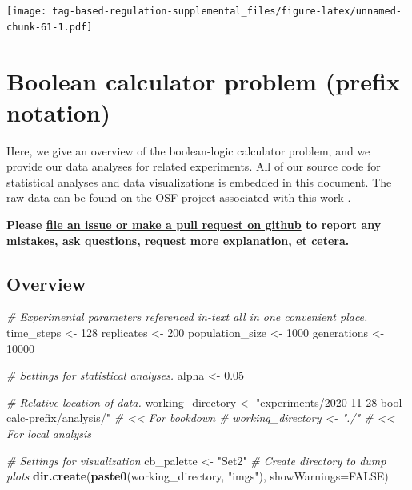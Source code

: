\documentclass[]{book}
\newenvironment{Shaded}{\begin{snugshade}}{\end{snugshade}}
\newcommand{\CommentTok}[1]{\textcolor[rgb]{0.56,0.35,0.01}{\textit{#1}}}
\newcommand{\DataTypeTok}[1]{\textcolor[rgb]{0.13,0.29,0.53}{#1}}
\newcommand{\DecValTok}[1]{\textcolor[rgb]{0.00,0.00,0.81}{#1}}
\newcommand{\FloatTok}[1]{\textcolor[rgb]{0.00,0.00,0.81}{#1}}
\newcommand{\KeywordTok}[1]{\textcolor[rgb]{0.13,0.29,0.53}{\textbf{#1}}}
\newcommand{\NormalTok}[1]{#1}
\newcommand{\OtherTok}[1]{\textcolor[rgb]{0.56,0.35,0.01}{#1}}
\newcommand{\StringTok}[1]{\textcolor[rgb]{0.31,0.60,0.02}{#1}}
\begin{document}
\texttt{[image: tag-based-regulation-supplemental\_files/figure-latex/unnamed-chunk-61-1.pdf]}

\hypertarget{boolean-calculator-problem-prefix-notation}{%
\chapter{Boolean calculator problem (prefix notation)}\label{boolean-calculator-problem-prefix-notation}}

Here, we give an overview of the boolean-logic calculator problem, and we provide our data analyses for related experiments.
All of our source code for statistical analyses and data visualizations is embedded in this document.
The raw data can be found on the OSF project associated with this work \citep{Lalejini_Moreno_Ofria_Data_2020}.

\textbf{Please \href{https://github.com/amlalejini/Tag-based-Genetic-Regulation-for-LinearGP/issues}{file an issue or make a pull request on github} to report any mistakes, ask questions, request more explanation, et cetera.}

\hypertarget{overview-2}{%
\section{Overview}\label{overview-2}}

\begin{Shaded}
\begin{Highlighting}[]
\CommentTok{# Experimental parameters referenced in-text all in one convenient place.}
\NormalTok{time_steps <-}\StringTok{ }\DecValTok{128}
\NormalTok{replicates <-}\StringTok{ }\DecValTok{200}
\NormalTok{population_size <-}\StringTok{ }\DecValTok{1000}
\NormalTok{generations <-}\StringTok{ }\DecValTok{10000}

\CommentTok{# Settings for statistical analyses.}
\NormalTok{alpha <-}\StringTok{ }\FloatTok{0.05}

\CommentTok{# Relative location of data.}
\NormalTok{working_directory <-}\StringTok{ "experiments/2020-11-28-bool-calc-prefix/analysis/"} \CommentTok{# << For bookdown}
\CommentTok{# working_directory <- "./"                                              # << For local analysis}

\CommentTok{# Settings for visualization}
\NormalTok{cb_palette <-}\StringTok{ "Set2"}
\CommentTok{# Create directory to dump plots}
\KeywordTok{dir.create}\NormalTok{(}\KeywordTok{paste0}\NormalTok{(working_directory, }\StringTok{"imgs"}\NormalTok{), }\DataTypeTok{showWarnings=}\OtherTok{FALSE}\NormalTok{)}
\end{Highlighting}
\end{Shaded}
\end{document}
